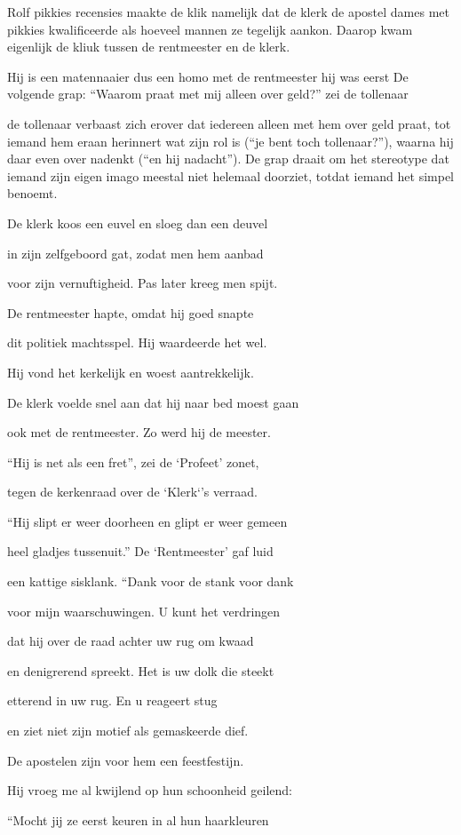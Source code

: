 Rolf pikkies recensies maakte de klik namelijk dat de klerk de apostel dames met pikkies kwalificeerde als hoeveel mannen ze tegelijk aankon. Daarop kwam eigenlijk de kliuk tussen de rentmeester en de klerk.

Hij is een matennaaier dus een homo met de rentmeester
hij was eerst De volgende grap: “Waarom praat met mij alleen over geld?” zei de tollenaar

de tollenaar verbaast zich erover dat iedereen alleen met hem over geld praat, tot iemand hem eraan herinnert wat zijn rol is (“je bent toch tollenaar?”), waarna hij daar even over nadenkt (“en hij nadacht”).
De grap draait om het stereotype dat iemand zijn eigen imago meestal niet helemaal doorziet, totdat iemand het simpel benoemt.

De klerk koos een euvel
en sloeg dan een deuvel

in zijn zelfgeboord gat,
zodat men hem aanbad

voor zijn vernuftigheid.
Pas later kreeg men spijt.

De rentmeester hapte,
omdat hij goed snapte

dit politiek machtsspel.
Hij waardeerde het wel.

Hij vond het kerkelijk
en woest aantrekkelijk.

De klerk voelde snel aan
dat hij naar bed moest gaan

ook met de rentmeester.
Zo werd hij de meester.

“Hij is net als een fret”,
zei de ‘Profeet’ zonet,

tegen de kerkenraad
over de ‘Klerk‘’s verraad.

“Hij slipt er weer doorheen
en glipt er weer gemeen

heel gladjes tussenuit.”
De ‘Rentmeester’ gaf luid

een kattige sisklank.
“Dank voor de stank voor dank

voor mijn waarschuwingen.
U kunt het verdringen

dat hij over de raad
achter uw rug om kwaad

en denigrerend spreekt.
Het is uw dolk die steekt

etterend in uw rug.
En u reageert stug

en ziet niet zijn motief
als gemaskeerde dief.

De apostelen zijn
voor hem een feestfestijn.

Hij vroeg me al kwijlend
op hun schoonheid geilend:

“Mocht jij ze eerst keuren
in al hun haarkleuren

